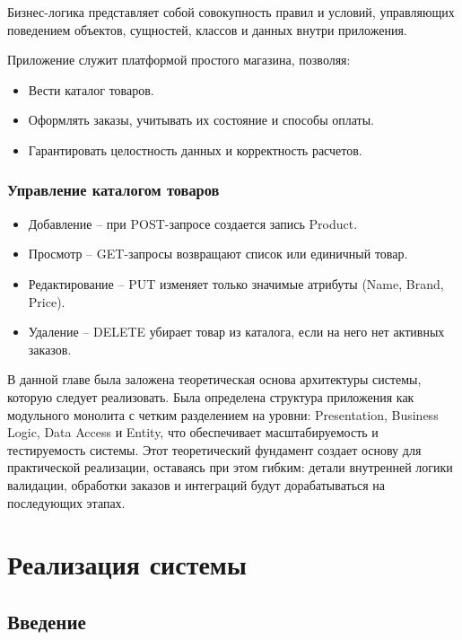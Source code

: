\documentclass[a4paper,12pt]{report}
\begin{document}
Бизнес-логика представляет собой совокупность правил и условий, управляющих поведением объектов, сущностей, классов и данных внутри приложения.

Приложение служит платформой простого магазина, позволяя:
\begin{itemize}
    \item
        Вести каталог товаров.
    \item
        Оформлять заказы, учитывать их состояние и способы оплаты.
    \item
        Гарантировать целостность данных и корректность расчетов.
\end{itemize}

\subsection{Управление каталогом  товаров}

\begin{itemize}
    \item
        Добавление -- при POST-запросе создается запись Product.
    \item 
        Просмотр -- GET-запросы возвращают список или единичный товар.
    \item   
        Редактирование -- PUT изменяет только значимые атрибуты (Name, Brand, Price).
    \item
        Удаление -- DELETE убирает товар из каталога, если на него нет активных заказов.
\end{itemize}


В данной главе была заложена теоретическая основа архитектуры системы, которую следует реализовать. 
Была определена структура приложения как модульного монолита с четким разделением на уровни: 
Presentation, Business Logic, Data Access и Entity, что обеспечивает масштабируемость и тестируемость системы.
Этот теоретический фундамент создает основу для практической реализации, оставаясь при этом гибким: 
детали внутренней логики валидации, обработки заказов и интеграций будут дорабатываться на последующих этапах.

\chapter{Реализация системы}\label{implementation_chapter_title}

\section{Введение}
\end{document}
